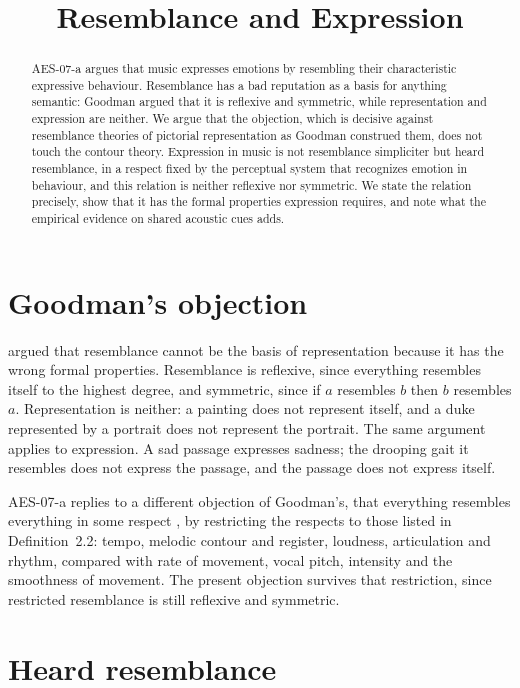\documentclass{situationist-preprint}
\title{Resemblance and Expression}
\begin{document}
\maketitle

\begin{abstract}
AES-07-a argues that music expresses emotions by resembling their characteristic expressive behaviour. Resemblance has a bad reputation as a basis for anything semantic: Goodman argued that it is reflexive and symmetric, while representation and expression are neither. We argue that the objection, which is decisive against resemblance theories of pictorial representation as Goodman construed them, does not touch the contour theory. Expression in music is not resemblance simpliciter but heard resemblance, in a respect fixed by the perceptual system that recognizes emotion in behaviour, and this relation is neither reflexive nor symmetric. We state the relation precisely, show that it has the formal properties expression requires, and note what the empirical evidence on shared acoustic cues adds.
\end{abstract}

\section{Goodman's objection}

\citet{Goodman1968} argued that resemblance cannot be the basis of representation because it has the wrong formal properties. Resemblance is reflexive, since everything resembles itself to the highest degree, and symmetric, since if $a$ resembles $b$ then $b$ resembles $a$. Representation is neither: a painting does not represent itself, and a duke represented by a portrait does not represent the portrait. The same argument applies to expression. A sad passage expresses sadness; the drooping gait it resembles does not express the passage, and the passage does not express itself.

AES-07-a replies to a different objection of Goodman's, that everything resembles everything in some respect \citep{Goodman1970}, by restricting the respects to those listed in Definition~2.2: tempo, melodic contour and register, loudness, articulation and rhythm, compared with rate of movement, vocal pitch, intensity and the smoothness of movement. The present objection survives that restriction, since restricted resemblance is still reflexive and symmetric.

\section{Heard resemblance}
\end{document}
